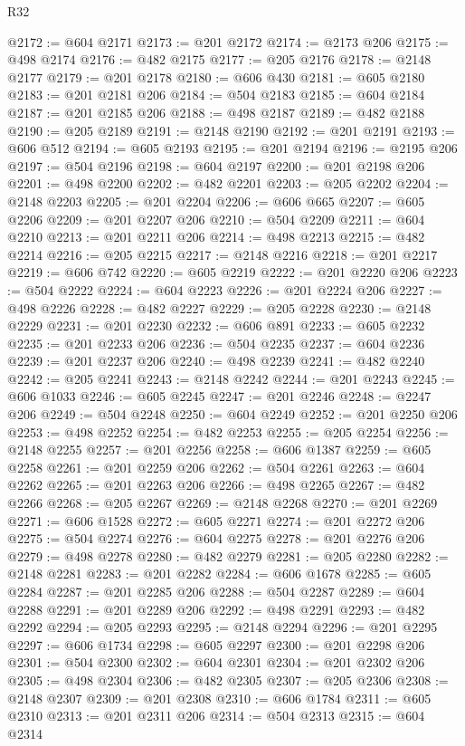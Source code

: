 \begin{lexlean}{R32}
\begin{coremodule}
@2172 := @604 @2171
@2173 := @201 @2172
@2174 := @2173 @206
@2175 := @498 @2174
@2176 := @482 @2175
@2177 := @205 @2176
@2178 := @2148 @2177
@2179 := @201 @2178
@2180 := @606 @430
@2181 := @605 @2180
@2183 := @201 @2181 @206
@2184 := @504 @2183
@2185 := @604 @2184
@2187 := @201 @2185 @206
@2188 := @498 @2187
@2189 := @482 @2188
@2190 := @205 @2189
@2191 := @2148 @2190
@2192 := @201 @2191
@2193 := @606 @512
@2194 := @605 @2193
@2195 := @201 @2194
@2196 := @2195 @206
@2197 := @504 @2196
@2198 := @604 @2197
@2200 := @201 @2198 @206
@2201 := @498 @2200
@2202 := @482 @2201
@2203 := @205 @2202
@2204 := @2148 @2203
@2205 := @201 @2204
@2206 := @606 @665
@2207 := @605 @2206
@2209 := @201 @2207 @206
@2210 := @504 @2209
@2211 := @604 @2210
@2213 := @201 @2211 @206
@2214 := @498 @2213
@2215 := @482 @2214
@2216 := @205 @2215
@2217 := @2148 @2216
@2218 := @201 @2217
@2219 := @606 @742
@2220 := @605 @2219
@2222 := @201 @2220 @206
@2223 := @504 @2222
@2224 := @604 @2223
@2226 := @201 @2224 @206
@2227 := @498 @2226
@2228 := @482 @2227
@2229 := @205 @2228
@2230 := @2148 @2229
@2231 := @201 @2230
@2232 := @606 @891
@2233 := @605 @2232
@2235 := @201 @2233 @206
@2236 := @504 @2235
@2237 := @604 @2236
@2239 := @201 @2237 @206
@2240 := @498 @2239
@2241 := @482 @2240
@2242 := @205 @2241
@2243 := @2148 @2242
@2244 := @201 @2243
@2245 := @606 @1033
@2246 := @605 @2245
@2247 := @201 @2246
@2248 := @2247 @206
@2249 := @504 @2248
@2250 := @604 @2249
@2252 := @201 @2250 @206
@2253 := @498 @2252
@2254 := @482 @2253
@2255 := @205 @2254
@2256 := @2148 @2255
@2257 := @201 @2256
@2258 := @606 @1387
@2259 := @605 @2258
@2261 := @201 @2259 @206
@2262 := @504 @2261
@2263 := @604 @2262
@2265 := @201 @2263 @206
@2266 := @498 @2265
@2267 := @482 @2266
@2268 := @205 @2267
@2269 := @2148 @2268
@2270 := @201 @2269
@2271 := @606 @1528
@2272 := @605 @2271
@2274 := @201 @2272 @206
@2275 := @504 @2274
@2276 := @604 @2275
@2278 := @201 @2276 @206
@2279 := @498 @2278
@2280 := @482 @2279
@2281 := @205 @2280
@2282 := @2148 @2281
@2283 := @201 @2282
@2284 := @606 @1678
@2285 := @605 @2284
@2287 := @201 @2285 @206
@2288 := @504 @2287
@2289 := @604 @2288
@2291 := @201 @2289 @206
@2292 := @498 @2291
@2293 := @482 @2292
@2294 := @205 @2293
@2295 := @2148 @2294
@2296 := @201 @2295
@2297 := @606 @1734
@2298 := @605 @2297
@2300 := @201 @2298 @206
@2301 := @504 @2300
@2302 := @604 @2301
@2304 := @201 @2302 @206
@2305 := @498 @2304
@2306 := @482 @2305
@2307 := @205 @2306
@2308 := @2148 @2307
@2309 := @201 @2308
@2310 := @606 @1784
@2311 := @605 @2310
@2313 := @201 @2311 @206
@2314 := @504 @2313
@2315 := @604 @2314

\end{coremodule}
\end{lexlean}
